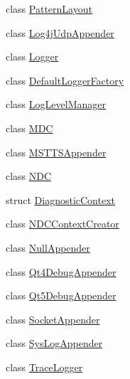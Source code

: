 \begin{DoxyCompactItemize}
\item 
class \hyperlink{classlog4cplus_1_1PatternLayout}{Pattern\-Layout}
\item 
class \hyperlink{classlog4cplus_1_1Log4jUdpAppender}{Log4j\-Udp\-Appender}
\item 
class \hyperlink{classlog4cplus_1_1Logger}{Logger}
\item 
class \hyperlink{classlog4cplus_1_1DefaultLoggerFactory}{Default\-Logger\-Factory}
\item 
class \hyperlink{classlog4cplus_1_1LogLevelManager}{Log\-Level\-Manager}
\item 
class \hyperlink{classlog4cplus_1_1MDC}{M\-D\-C}
\item 
class \hyperlink{classlog4cplus_1_1MSTTSAppender}{M\-S\-T\-T\-S\-Appender}
\item 
class \hyperlink{classlog4cplus_1_1NDC}{N\-D\-C}
\item 
struct \hyperlink{structlog4cplus_1_1DiagnosticContext}{Diagnostic\-Context}
\item 
class \hyperlink{classlog4cplus_1_1NDCContextCreator}{N\-D\-C\-Context\-Creator}
\item 
class \hyperlink{classlog4cplus_1_1NullAppender}{Null\-Appender}
\item 
class \hyperlink{classlog4cplus_1_1Qt4DebugAppender}{Qt4\-Debug\-Appender}
\item 
class \hyperlink{classlog4cplus_1_1Qt5DebugAppender}{Qt5\-Debug\-Appender}
\item 
class \hyperlink{classlog4cplus_1_1SocketAppender}{Socket\-Appender}
\item 
class \hyperlink{classlog4cplus_1_1SysLogAppender}{Sys\-Log\-Appender}
\item 
class \hyperlink{classlog4cplus_1_1TraceLogger}{Trace\-Logger}
\end{DoxyCompactItemize}
